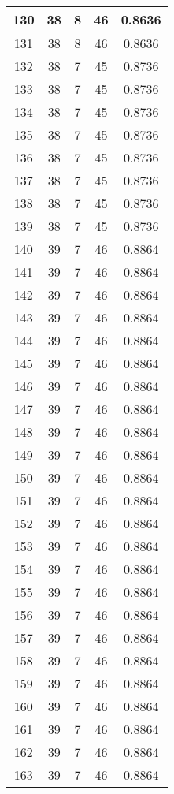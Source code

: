 \documentclass[letterpaper, 12pt]{article}
\begin{document}
\begin{longtable}{|c|c|c|c|c|}
\hline
130 & 38 & 8 & 46 & 0.8636 \\
\hline
131 & 38 & 8 & 46 & 0.8636 \\
\hline
132 & 38 & 7 & 45 & 0.8736 \\
\hline
133 & 38 & 7 & 45 & 0.8736 \\
\hline
134 & 38 & 7 & 45 & 0.8736 \\
\hline
135 & 38 & 7 & 45 & 0.8736 \\
\hline
136 & 38 & 7 & 45 & 0.8736 \\
\hline
137 & 38 & 7 & 45 & 0.8736 \\
\hline
138 & 38 & 7 & 45 & 0.8736 \\
\hline
139 & 38 & 7 & 45 & 0.8736 \\
\hline
140 & 39 & 7 & 46 & 0.8864 \\
\hline
141 & 39 & 7 & 46 & 0.8864 \\
\hline
142 & 39 & 7 & 46 & 0.8864 \\
\hline
143 & 39 & 7 & 46 & 0.8864 \\
\hline
144 & 39 & 7 & 46 & 0.8864 \\
\hline
145 & 39 & 7 & 46 & 0.8864 \\
\hline
146 & 39 & 7 & 46 & 0.8864 \\
\hline
147 & 39 & 7 & 46 & 0.8864 \\
\hline
148 & 39 & 7 & 46 & 0.8864 \\
\hline
149 & 39 & 7 & 46 & 0.8864 \\
\hline
150 & 39 & 7 & 46 & 0.8864 \\
\hline
151 & 39 & 7 & 46 & 0.8864 \\
\hline
152 & 39 & 7 & 46 & 0.8864 \\
\hline
153 & 39 & 7 & 46 & 0.8864 \\
\hline
154 & 39 & 7 & 46 & 0.8864 \\
\hline
155 & 39 & 7 & 46 & 0.8864 \\
\hline
156 & 39 & 7 & 46 & 0.8864 \\
\hline
157 & 39 & 7 & 46 & 0.8864 \\
\hline
158 & 39 & 7 & 46 & 0.8864 \\
\hline
159 & 39 & 7 & 46 & 0.8864 \\
\hline
160 & 39 & 7 & 46 & 0.8864 \\
\hline
161 & 39 & 7 & 46 & 0.8864 \\
\hline
162 & 39 & 7 & 46 & 0.8864 \\
\hline
163 & 39 & 7 & 46 & 0.8864 \\

\end{longtable}
\end{document}

